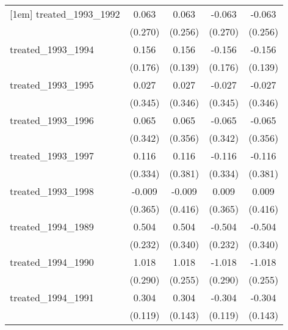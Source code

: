 {\begin{tabular}{l*{4}{c}}
[1em]
treated\_1993\_1992&       0.063         &       0.063         &      -0.063         &      -0.063         \\
            &     (0.270)         &     (0.256)         &     (0.270)         &     (0.256)         \\
[1em]
treated\_1993\_1994&       0.156         &       0.156         &      -0.156         &      -0.156         \\
            &     (0.176)         &     (0.139)         &     (0.176)         &     (0.139)         \\
[1em]
treated\_1993\_1995&       0.027         &       0.027         &      -0.027         &      -0.027         \\
            &     (0.345)         &     (0.346)         &     (0.345)         &     (0.346)         \\
[1em]
treated\_1993\_1996&       0.065         &       0.065         &      -0.065         &      -0.065         \\
            &     (0.342)         &     (0.356)         &     (0.342)         &     (0.356)         \\
[1em]
treated\_1993\_1997&       0.116         &       0.116         &      -0.116         &      -0.116         \\
            &     (0.334)         &     (0.381)         &     (0.334)         &     (0.381)         \\
[1em]
treated\_1993\_1998&      -0.009         &      -0.009         &       0.009         &       0.009         \\
            &     (0.365)         &     (0.416)         &     (0.365)         &     (0.416)         \\
[1em]
treated\_1994\_1989&       0.504\sym{*}  &       0.504         &      -0.504\sym{*}  &      -0.504         \\
            &     (0.232)         &     (0.340)         &     (0.232)         &     (0.340)         \\
[1em]
treated\_1994\_1990&       1.018\sym{***}&       1.018\sym{***}&      -1.018\sym{***}&      -1.018\sym{***}\\
            &     (0.290)         &     (0.255)         &     (0.290)         &     (0.255)         \\
[1em]
treated\_1994\_1991&       0.304\sym{*}  &       0.304\sym{*}  &      -0.304\sym{*}  &      -0.304\sym{*}  \\
            &     (0.119)         &     (0.143)         &     (0.119)         &     (0.143)         \\

\end{tabular}}

